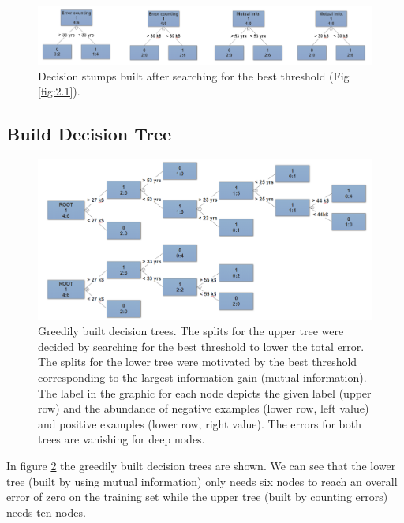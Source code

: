 \documentclass[12pt]{article}
\begin{document}
\begin{figure}[h!]
	\centering
	\includegraphics[width=1\linewidth]{../Problem_2/Figure_2.1_stamps.PNG}
	\caption{Decision stumps built after searching for the best threshold (Fig \ref{fig:2.1}).}
	\label{fig:stumps}
\end{figure}

\subsection{Build Decision Tree}

\begin{figure}[h]
	\centering
	\includegraphics[width=1\linewidth]{../Problem_2/2.2.png}
	\caption{Greedily built decision trees. The splits for the upper tree were decided by searching for the best threshold to lower the total error. The splits for the lower tree were motivated by the best threshold corresponding to the largest information gain (mutual information). The label in the graphic for each node depicts the given label (upper row) and the abundance of negative examples (lower row, left value) and positive examples (lower row, right value). The errors for both trees are vanishing for deep nodes.}
	\label{fig:tree}
\end{figure}



In figure \ref{fig:tree} the greedily built decision trees are shown. We can see that the lower tree (built by using mutual information) only needs six nodes to reach an overall error of zero on the training set while the upper tree (built by counting errors) needs ten nodes. 
\end{document}
